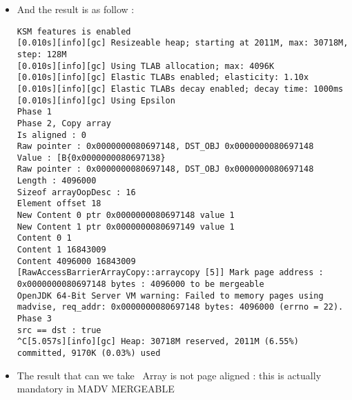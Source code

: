 \begin{itemize}
\item And the result is as follow :

\begin{verbatim}
KSM features is enabled
[0.010s][info][gc] Resizeable heap; starting at 2011M, max: 30718M, step: 128M
[0.010s][info][gc] Using TLAB allocation; max: 4096K
[0.010s][info][gc] Elastic TLABs enabled; elasticity: 1.10x
[0.010s][info][gc] Elastic TLABs decay enabled; decay time: 1000ms
[0.010s][info][gc] Using Epsilon
Phase 1
Phase 2, Copy array
Is aligned : 0
Raw pointer : 0x0000000080697148, DST_OBJ 0x0000000080697148
Value : [B{0x0000000080697138}
Raw pointer : 0x0000000080697148, DST_OBJ 0x0000000080697148
Length : 4096000
Sizeof arrayOopDesc : 16
Element offset 18
New Content 0 ptr 0x0000000080697148 value 1
New Content 1 ptr 0x0000000080697149 value 1
Content 0 1
Content 1 16843009
Content 4096000 16843009
[RawAccessBarrierArrayCopy::arraycopy [5]] Mark page address : 0x0000000080697148 bytes : 4096000 to be mergeable
OpenJDK 64-Bit Server VM warning: Failed to memory pages using madvise, req_addr: 0x0000000080697148 bytes: 4096000 (errno = 22).
Phase 3
src == dst : true
^C[5.057s][info][gc] Heap: 30718M reserved, 2011M (6.55%) committed, 9170K (0.03%) used
\end{verbatim}

\item The result that can we take \
  Array is not page aligned : this is actually mandatory in MADV MERGEABLE
\end{itemize}